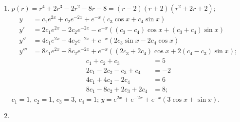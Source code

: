 \documentclass[openany]{book}
\newenvironment{sectionSolutions}{
 \begin{enumerate}[item-label={\thesection.\arabic{enumi}.}]
}{
 \end{enumerate}
}
\begin{document}
\begin{sectionSolutions}
\item
$p(r)=r^4+2r^3-2r^2-8r-8=(r-2)(r+2)(r^2+2r+2)$;
\begin{align*}
y&=c_1e^{2x}+c_2e^{-2x}+e^{-x}(c_3\cos x+c_4\sin x)\\
y'&=2c_1e^{2x}-2c_2e^{-2x}-e^{-x}((c_3-c_4)\cos x+(c_3+c_4)\sin x)\\
y''&=4c_1e^{2x}+4c_2e^{-2x}+e^{-x}(2c_3\sin x-2c_4\cos x)\\
y'''&=8c_1e^{2x}-8c_2e^{-2x}+e^{-x}((2c_3+2c_4)\cos x+2(c_4-c_3)\sin
x);
\end{align*}
\begin{align*}
c_1+c_2+c_3&=5\\
2c_1-2c_2-c_3+c_4&=-2\\
4c_1+4c_2-2c_4&=6\\
8c_1-8c_2+2c_3+2c_4&=8;
\end{align*}
$c_1=1$, $c_2=1$, $c_3=3$, $c_4=1$;
$y=e^{2x}+e^{-2x}+e^{-x}(3\cos x+\sin x)$.


\item
{}
\end{sectionSolutions}
\end{document}
